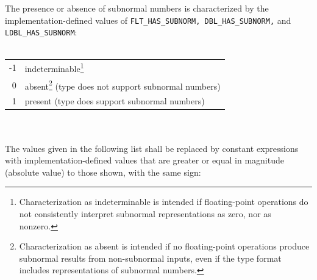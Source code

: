 The presence or absence of subnormal numbers is characterized by the
implementation-defined values of \texttt{FLT\_HAS\_SUBNORM, DBL\_HAS\_SUBNORM,}
and \texttt{LDBL\_HAS\_SUBNORM}:
\\\\
\hspace*{1cm}\begin{tabular}{rl}
-1 & indeterminable\footnote{Characterization as indeterminable is intended if
  floating-point operations do not consistently interpret subnormal
  representations as zero, nor as nonzero.}\\
0 & absent\footnote{Characterization as absent is intended if no floating-point
  operations produce subnormal results from non-subnormal inputs, even if the
  type format includes representations of subnormal numbers.} (type does not
support subnormal numbers)\\
1 & present (type does support subnormal numbers)
\end{tabular}
\\\\
The values given in the following list shall be replaced by constant
expressions with implementation-defined values that are greater or equal in
magnitude (absolute value) to those shown, with the same sign:

